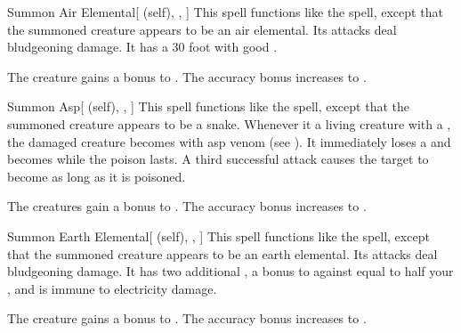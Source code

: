 \lowercase{\hypertarget{spell:Summon Air Elemental}{}}\label{spell:Summon Air Elemental}
\begin{attuneability}[Rank 4]{\hypertarget{spell:Summon Air Elemental}{Summon Air Elemental}}[ (self), , ]
This spell functions like the  spell, except that the summoned creature appears to be an air elemental.
Its attacks deal bludgeoning damage.
It has a 30 foot  with good .

\rankline
{} The creature gains a  bonus to .
 The accuracy bonus increases to .

\end{attuneability}
\vspace{0.25em}



\lowercase{\hypertarget{spell:Summon Asp}{}}\label{spell:Summon Asp}
\begin{attuneability}[Rank 4]{\hypertarget{spell:Summon Asp}{Summon Asp}}[ (self), , ]
This spell functions like the  spell, except that the summoned creature appears to be a snake.
Whenever it  a living creature with a , the damaged creature becomes  with asp venom (see ).
It immediately loses a  and becomes  while the poison lasts.
A third successful attack causes the target to become  as long as it is poisoned.

\rankline
{} The creatures gain a  bonus to .
 The accuracy bonus increases to .

\end{attuneability}
\vspace{0.25em}



\lowercase{\hypertarget{spell:Summon Earth Elemental}{}}\label{spell:Summon Earth Elemental}
\begin{attuneability}[Rank 4]{\hypertarget{spell:Summon Earth Elemental}{Summon Earth Elemental}}[ (self), , ]
This spell functions like the  spell, except that the summoned creature appears to be an earth elemental.
Its attacks deal bludgeoning damage.
It has two additional , a bonus to  against  equal to half your , and is immune to electricity damage.

\rankline
{} The creature gains a  bonus to .
 The accuracy bonus increases to .

\end{attuneability}
\vspace{0.25em}



